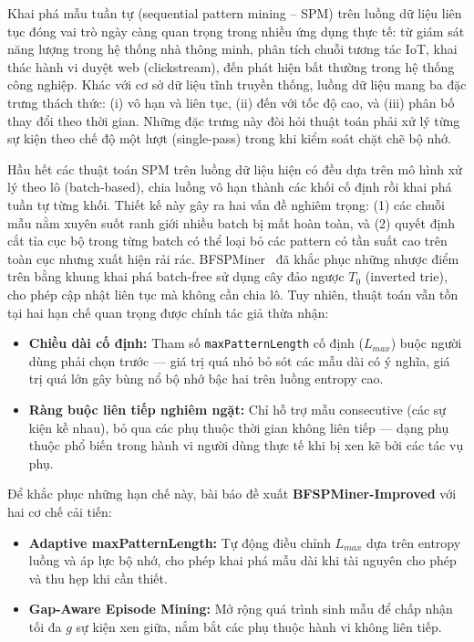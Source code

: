 \documentclass{article}
\begin{document}
Khai phá mẫu tuần tự (sequential pattern mining -- SPM) trên luồng dữ liệu liên tục đóng vai trò ngày càng quan trọng trong nhiều ứng dụng thực tế: từ giám sát năng lượng trong hệ thống nhà thông minh, phân tích chuỗi tương tác IoT, khai thác hành vi duyệt web (clickstream), đến phát hiện bất thường trong hệ thống công nghiệp. Khác với cơ sở dữ liệu tĩnh truyền thống, luồng dữ liệu mang ba đặc trưng thách thức: (i) vô hạn và liên tục, (ii) đến với tốc độ cao, và (iii) phân bố thay đổi theo thời gian. Những đặc trưng này đòi hỏi thuật toán phải xử lý từng sự kiện theo chế độ một lượt (single-pass) trong khi kiểm soát chặt chẽ bộ nhớ.

Hầu hết các thuật toán SPM trên luồng dữ liệu hiện có đều dựa trên mô hình xử lý theo lô (batch-based), chia luồng vô hạn thành các khối cố định rồi khai phá tuần tự từng khối. Thiết kế này gây ra hai vấn đề nghiêm trọng: (1) các chuỗi mẫu nằm xuyên suốt ranh giới nhiều batch bị mất hoàn toàn, và (2) quyết định cắt tỉa cục bộ trong từng batch có thể loại bỏ các pattern có tần suất cao trên toàn cục nhưng xuất hiện rải rác. BFSPMiner~\cite{hassani2019} đã khắc phục những nhược điểm trên bằng khung khai phá batch-free sử dụng cây đảo ngược $T_0$ (inverted trie), cho phép cập nhật liên tục mà không cần chia lô. Tuy nhiên, thuật toán vẫn tồn tại hai hạn chế quan trọng được chính tác giả thừa nhận:

\begin{itemize}
    \item \textbf{Chiều dài cố định:} Tham số \texttt{maxPatternLength} cố định ($L_{max}$) buộc người dùng phải chọn trước --- giá trị quá nhỏ bỏ sót các mẫu dài có ý nghĩa, giá trị quá lớn gây bùng nổ bộ nhớ bậc hai trên luồng entropy cao.
    \item \textbf{Ràng buộc liên tiếp nghiêm ngặt:} Chỉ hỗ trợ mẫu consecutive (các sự kiện kề nhau), bỏ qua các phụ thuộc thời gian không liên tiếp --- dạng phụ thuộc phổ biến trong hành vi người dùng thực tế khi bị xen kẽ bởi các tác vụ phụ.
\end{itemize}

Để khắc phục những hạn chế này, bài báo đề xuất \textbf{BFSPMiner-Improved} với hai cơ chế cải tiến:
\begin{itemize}
    \item \textbf{Adaptive maxPatternLength:} Tự động điều chỉnh $L_{max}$ dựa trên entropy luồng và áp lực bộ nhớ, cho phép khai phá mẫu dài khi tài nguyên cho phép và thu hẹp khi cần thiết.
    \item \textbf{Gap-Aware Episode Mining:} Mở rộng quá trình sinh mẫu để chấp nhận tối đa $g$ sự kiện xen giữa, nắm bắt các phụ thuộc hành vi không liên tiếp.
\end{itemize}
\end{document}
